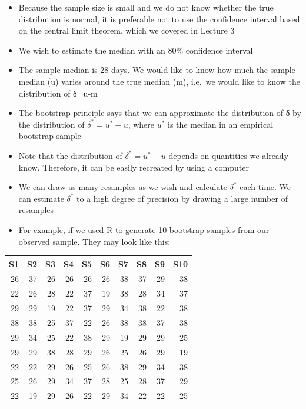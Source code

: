\documentclass[
]{book}
\providecommand{\tightlist}{%
  \setlength{\itemsep}{0pt}\setlength{\parskip}{0pt}}
\begin{document}
\begin{itemize}
\tightlist
\item
  Because the sample size is small and we do not know whether the true distribution is normal, it is preferable not to use the confidence interval based on the central limit theorem, which we covered in Lecture 3
\item
  We wish to estimate the median with an 80\% confidence interval
\item
  The sample median is 28 days. We would like to know how much the sample median (u) varies around the true median (m), i.e.~we would like to know the distribution of δ=u-m
\item
  The bootstrap principle says that we can approximate the distribution of δ by the distribution of \(δ^*= u^*-u\), where \(u^*\) is the median in an empirical bootstrap sample
\item
  Note that the distribution of \(δ^*= u^*-u\) depends on quantities we already know. Therefore, it can be easily recreated by using a computer
\item
  We can draw as many resamples as we wish and calculate \(δ^*\) each time. We can estimate \(δ^*\) to a high degree of precision by drawing a large number of resamples
\item
  For example, if we used R to generate 10 bootstrap samples from our observed sample. They may look like this:
\end{itemize}

\begin{tabular}{r|r|r|r|r|r|r|r|r|r}
\hline
S1 & S2 & S3 & S4 & S5 & S6 & S7 & S8 & S9 & S10\\
\hline
26 & 37 & 26 & 26 & 26 & 26 & 38 & 37 & 29 & 38\\
\hline
22 & 26 & 28 & 22 & 37 & 19 & 38 & 28 & 34 & 37\\
\hline
29 & 29 & 19 & 22 & 37 & 29 & 34 & 38 & 22 & 38\\
\hline
38 & 38 & 25 & 37 & 22 & 26 & 38 & 38 & 37 & 38\\
\hline
29 & 34 & 25 & 22 & 38 & 29 & 19 & 29 & 29 & 25\\
\hline
29 & 29 & 38 & 28 & 29 & 26 & 25 & 26 & 29 & 19\\
\hline
22 & 22 & 29 & 26 & 25 & 26 & 38 & 29 & 34 & 38\\
\hline
25 & 26 & 29 & 34 & 37 & 28 & 25 & 28 & 37 & 29\\
\hline
22 & 19 & 29 & 26 & 22 & 29 & 34 & 22 & 22 & 25\\
\hline
\end{tabular}
\end{document}
